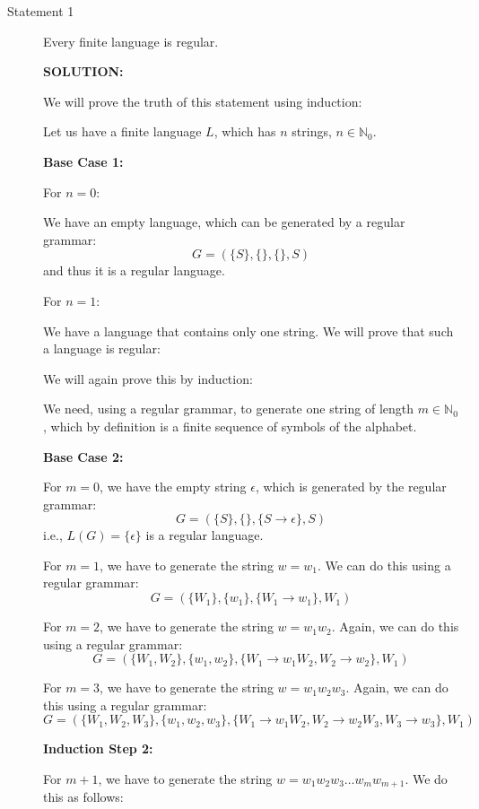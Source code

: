 \documentclass[10pt]{article}
\begin{document}
\begin{description}
    \item[Statement 1] Every finite language is regular.
    
        \textbf{SOLUTION:} 

        We will prove the truth of this statement using induction:

        Let us have a finite language $L$, which has $n$ strings, $n \in \mathbb{N}_0$.

        \textbf{Base Case 1:}

        For $n = 0$: 
        
        We have an empty language, which can be generated by a regular grammar: 
        $$G = ( \{S\}, \{\}, \{\}, S)$$ and thus it is a regular language.

        For $n = 1$:

        We have a language that contains only one string. We will prove that such a language is regular:

        We will again prove this by induction:

        We need, using a regular grammar, to generate one string of length $m \in \mathbb{N}_0$, which by definition is a finite sequence of symbols of the alphabet.

        \textbf{Base Case 2:}

        For $m = 0$, we have the empty string $\epsilon$, which is generated by the regular grammar:
        $$G = (\{S\},\{\}, \{S\rightarrow \epsilon\},S)$$
        i.e., $L(G)=\{\epsilon\}$ is a regular language.

        For $m = 1$, we have to generate the string $w = w_1$. We can do this using a regular grammar:
        $$G = (\{W_1\},\{w_1\}, \{W_1\rightarrow w_1\},W_1)$$

        For $m = 2$, we have to generate the string $w = w_{1}w_{2}$. Again, we can do this using a regular grammar:
        $$G = (\{W_1, W_2\},\{w_1, w_2\}, \{W_1\rightarrow w_{1}W_2, W_2 \rightarrow w_2\},W_1)$$

        For $m = 3$, we have to generate the string $w = w_{1}w_{2}w_{3}$. Again, we can do this using a regular grammar:
        $$G = (\{W_1, W_2, W_3\},\{w_1, w_2, w_3\}, \{W_1\rightarrow w_{1}W_2, W_2 \rightarrow w_{2}W_3, W_3 \rightarrow w_3\},W_1)$$

        \textbf{Induction Step 2:}

        For $m + 1$, we have to generate the string $w = w_{1}w_{2}w_{3}\dots w_{m}w_{m+1}$. We do this as follows:


\end{description}
\end{document}
